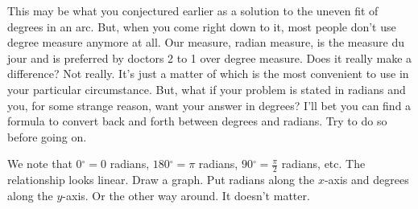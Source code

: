 \documentclass[english]{book}
\newcommand{\degrees}{\ensuremath{^{\circ}}}
\begin{document}
This may be what you conjectured earlier as a solution to the uneven fit of degrees in an arc. But, when you come right down to it, most people don't use degree measure anymore at all. Our measure, radian measure, is the measure du jour and is preferred by doctors 2 to 1 over degree measure. Does it really make a difference? Not really. It's just a matter of which is the most convenient to use in your particular circumstance. But, what if your problem is stated in radians and you, for some strange reason, want your answer in degrees? I'll bet you can find a formula to convert back and forth between degrees and radians. Try to do so before going on.

We note that $0 \degrees = 0$ radians, $180 \degrees = \pi$ radians, $90 \degrees = \frac{\pi}{2}$ radians, etc. The relationship looks linear. Draw a graph. Put radians along the $x$-axis and degrees along the $y$-axis. Or the other way around. It doesn't matter.
\end{document}
